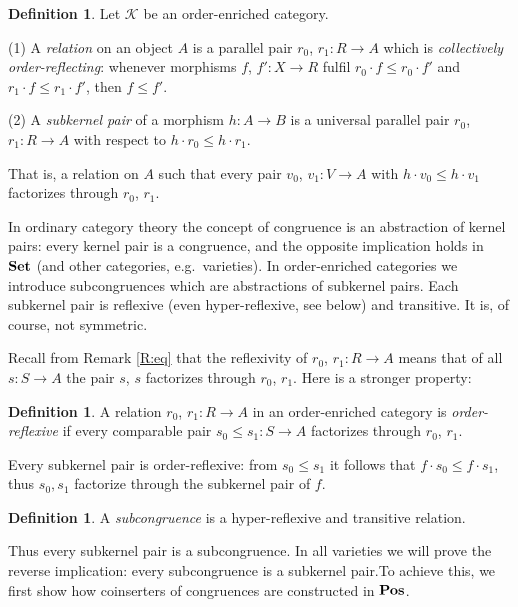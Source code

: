 \documentclass[12pt,amstex,leqno]{amsart}
\newcommand\Set{\operatorname{\bf Set}}
\newcommand\Pos{\operatorname{\bf Pos}}
\newcommand\ck{\mathcal {K}}
\theoremstyle{definition}
\newtheorem{defi}[theorem]{Definition}
\numberwithin{equation}{section}
\begin{document}
\begin{defi}
Let $\ck$ be an order-enriched category.

\vskip1mm
(1) A \emph{relation} on an object $A$ is a parallel pair $r_0$, $r_1\colon R\to A$ which is \emph{collectively order-reflecting}: whenever morphisms $f$, $f'\colon X \to R$ fulfil $r_0\cdot f \leq r_0\cdot f'$ and $r_1\cdot f \leq r_1\cdot f'$, then $f\leq f'$.

\vskip 1mm
(2)
 A \emph{subkernel pair} of a morphism $h\colon A\to B$ is a universal parallel pair $r_0$, $r_1\colon R\to A$ with respect to $h\cdot r_0 \leq h\cdot r_1$.

That is, a relation on $A$ such that every pair $v_0$, $v_1\colon V\to A$ with $h\cdot v_0 \leq h\cdot v_1$ factorizes through $r_0$, $r_1$.
\end{defi}
  
In ordinary category theory the concept of congruence is an abstraction of kernel pairs: every  kernel pair is a congruence, and the opposite  implication holds in $\Set$ (and other categories, e.g.\ varieties). In order-enriched categories we introduce subcongruences which are abstractions of subkernel pairs. Each subkernel pair is reflexive (even hyper-reflexive, see below) and transitive. It is, of course, not symmetric.

Recall from Remark \ref{R:eq} that the  reflexivity of $r_0$, $r_1\colon R\to A$ means that of all $s\colon S\to A$ the pair $s$, $s$ factorizes through $r_0$, $r_1$. Here is a stronger property:

\begin{defi}\label{D:hyper}
A relation $r_0$, $r_1\colon R\to A$ in an order-enriched category is
\emph{order-reflexive} if every comparable pair $s_0 \leq s_1 \colon S\to A$ factorizes through $r_0$, $r_1$.
\end{defi}

Every subkernel pair is order-reflexive: from $s_0 \leq s_1$ it follows that $f \cdot s_0 \leq f \cdot s_1$,
thus $s_0 ,s_1$ factorize through the subkernel pair of $f$.

\begin {defi} A \emph{subcongruence} is a hyper-reflexive and transitive relation.
\end{defi}

Thus every subkernel pair is  a subcongruence.
In all varieties we will prove the reverse implication: 
every subcongruence is a subkernel pair.To achieve this, we first show how coinserters of congruences are constructed in $\Pos$. 
\end{document}
